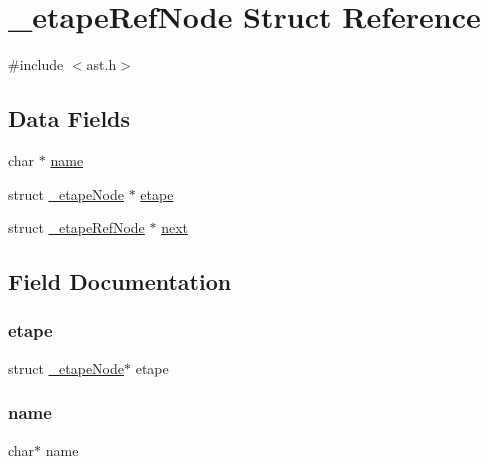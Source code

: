 \hypertarget{struct__etape_ref_node}{}\section{\+\_\+etape\+Ref\+Node Struct Reference}
\label{struct__etape_ref_node}


{\ttfamily \#include $<$ast.\+h$>$}

\subsection*{Data Fields}
\begin{DoxyCompactItemize}
\item 
char $\ast$ \hyperlink{struct__etape_ref_node_a5ac083a645d964373f022d03df4849c8}{name}
\item 
struct \hyperlink{struct__etape_node}{\+\_\+etape\+Node} $\ast$ \hyperlink{struct__etape_ref_node_acdd0ddc9d9620f6e326ce945909cf560}{etape}
\item 
struct \hyperlink{struct__etape_ref_node}{\+\_\+etape\+Ref\+Node} $\ast$ \hyperlink{struct__etape_ref_node_a7af4a14b465f82d65763ae5982a22dce}{next}
\end{DoxyCompactItemize}


\subsection{Field Documentation}
\mbox{\label{struct__etape_ref_node_acdd0ddc9d9620f6e326ce945909cf560}} 
\subsubsection{\texorpdfstring{etape}{etape}}
{\footnotesize\ttfamily struct \hyperlink{struct__etape_node}{\+\_\+etape\+Node}$\ast$ etape}

\mbox{\label{struct__etape_ref_node_a5ac083a645d964373f022d03df4849c8}} 
\subsubsection{\texorpdfstring{name}{name}}
{\footnotesize\ttfamily char$\ast$ name}

